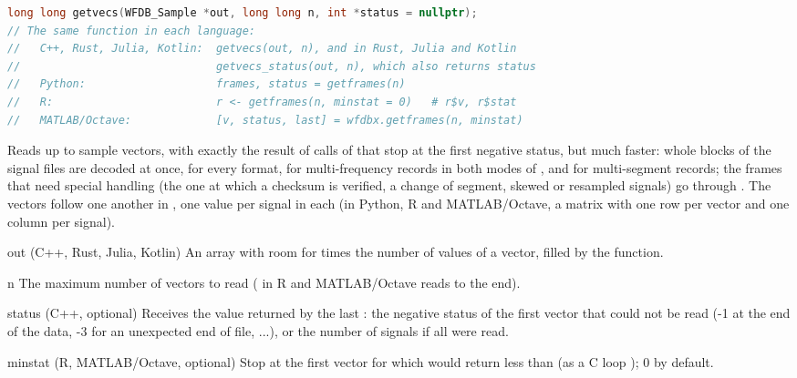 \begin{lstlisting}[language=C++,style=signature]
long long getvecs(WFDB_Sample *out, long long n, int *status = nullptr);
// The same function in each language:
//   C++, Rust, Julia, Kotlin:  getvecs(out, n), and in Rust, Julia and Kotlin
//                              getvecs_status(out, n), which also returns status
//   Python:                    frames, status = getframes(n)
//   R:                         r <- getframes(n, minstat = 0)   # r$v, r$stat
//   MATLAB/Octave:             [v, status, last] = wfdbx.getframes(n, minstat)
\end{lstlisting}
Reads up to  sample vectors, with exactly the result of 
calls of  that stop at the first negative status, but much
faster: whole blocks of the signal files are decoded at once, for every
format, for multi-frequency records in both modes of , and for
multi-segment records; the frames that need special handling (the one at
which a checksum is verified, a change of segment, skewed or resampled
signals) go through . The vectors follow one another in
, one value per signal in each (in Python, R and MATLAB/Octave, a
matrix with one row per vector and one column per signal).
\begin{params}
\item[out] (C++, Rust, Julia, Kotlin) An array with room for  times
  the number of values of a vector, filled by the function.
\item[n] The maximum number of vectors to read ( in R and
  MATLAB/Octave reads to the end).
\item[status] (C++, optional) Receives the value returned by the last
  : the negative status of the first vector that could not be
  read (-1 at the end of the data, -3 for an unexpected end of file, ...), or
  the number of signals if all  were read.
\item[minstat] (R, MATLAB/Octave, optional) Stop at the first vector for
  which  would return less than  (as a C loop
  ); 0 by default.
\end{params}

